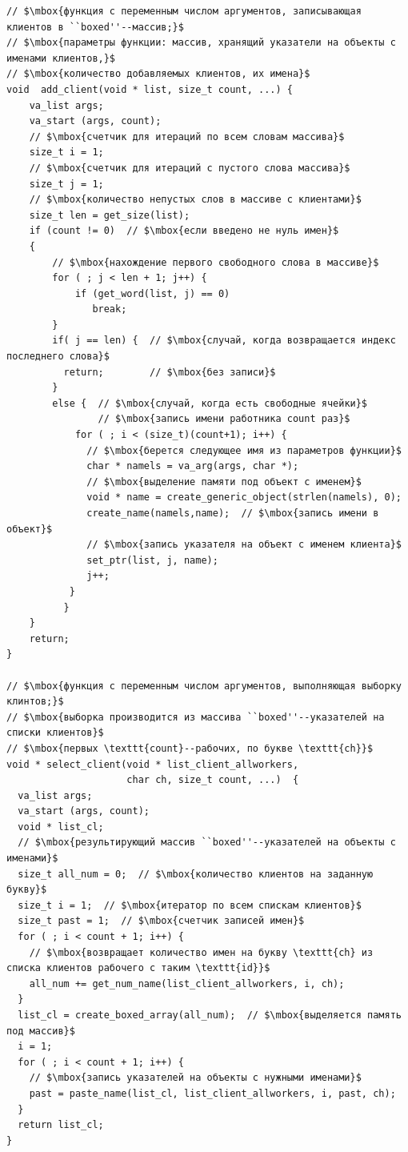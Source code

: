 \begin{lstlisting}[mathescape]
// $\mbox{функция с переменным числом аргументов, записывающая клиентов в ``boxed''--массив;}$
// $\mbox{параметры функции: массив, хранящий указатели на объекты с именами клиентов,}$
// $\mbox{количество добавляемых клиентов, их имена}$
void  add_client(void * list, size_t count, ...) {
    va_list args;
    va_start (args, count);
    // $\mbox{счетчик для итераций по всем словам массива}$
    size_t i = 1;
    // $\mbox{счетчик для итераций с пустого слова массива}$
    size_t j = 1;
    // $\mbox{количество непустых слов в массиве с клиентами}$
    size_t len = get_size(list);
    if (count != 0)  // $\mbox{если введено не нуль имен}$
    {
        // $\mbox{нахождение первого свободного слова в массиве}$
        for ( ; j < len + 1; j++) { 
            if (get_word(list, j) == 0)
               break;
        }
        if( j == len) {  // $\mbox{случай, когда возвращается индекс последнего слова}$
          return;        // $\mbox{без записи}$
        }
        else {  // $\mbox{случай, когда есть свободные ячейки}$
                // $\mbox{запись имени работника count раз}$
            for ( ; i < (size_t)(count+1); i++) {
              // $\mbox{берется следующее имя из параметров функции}$
              char * namels = va_arg(args, char *);
              // $\mbox{выделение памяти под объект с именем}$
              void * name = create_generic_object(strlen(namels), 0);  
              create_name(namels,name);  // $\mbox{запись имени в объект}$
              // $\mbox{запись указателя на объект с именем клиента}$
              set_ptr(list, j, name);
              j++;
           }
          }
    }
    return;
}

// $\mbox{функция с переменным числом аргументов, выполняющая выборку клинтов;}$
// $\mbox{выборка производится из массива ``boxed''--указателей на списки клиентов}$
// $\mbox{первых \texttt{count}--рабочих, по букве \texttt{ch}}$
void * select_client(void * list_client_allworkers,
                     char ch, size_t count, ...)  {  
  va_list args;
  va_start (args, count);
  void * list_cl;  
  // $\mbox{результирующий массив ``boxed''--указателей на объекты с именами}$
  size_t all_num = 0;  // $\mbox{количество клиентов на заданную букву}$
  size_t i = 1;  // $\mbox{итератор по всем спискам клиентов}$
  size_t past = 1;  // $\mbox{счетчик записей имен}$
  for ( ; i < count + 1; i++) {
    // $\mbox{возвращает количество имен на букву \texttt{ch} из списка клиентов рабочего с таким \texttt{id}}$
    all_num += get_num_name(list_client_allworkers, i, ch);   
  }
  list_cl = create_boxed_array(all_num);  // $\mbox{выделяется память под массив}$
  i = 1;
  for ( ; i < count + 1; i++) {
    // $\mbox{запись указателей на объекты с нужными именами}$
    past = paste_name(list_cl, list_client_allworkers, i, past, ch);
  }
  return list_cl;
}


\end{lstlisting}
